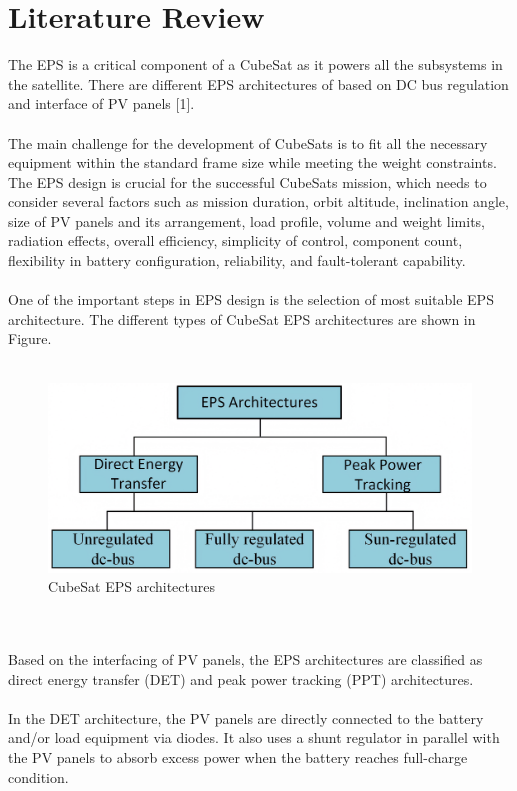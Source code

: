 \section{Literature Review}
\justifying
The EPS is a critical component of a CubeSat as it powers all the subsystems in the satellite. There are different EPS architectures of based on DC bus regulation and interface of PV panels [1].
\\ \\
The main challenge for the development of CubeSats is to fit all the necessary equipment within the standard frame size while meeting the weight constraints. The EPS design is crucial for the successful CubeSats mission, which needs to consider several factors such as mission duration, orbit altitude, inclination angle, size of PV panels and its arrangement, load profile, volume and weight limits, radiation effects, overall efficiency, simplicity of control, component count, flexibility in battery configuration, reliability, and fault-tolerant capability. 
\\ \\
One of the important steps in EPS design is the selection of most suitable EPS architecture. The different types of CubeSat EPS architectures are shown in Figure. 
\\ \\
\begin{figure}[h]
	\centering
	\includegraphics[width=\columnwidth]{IMGS/EPSarchitectures.jpg}
	\caption{CubeSat EPS architectures}
	\label{fig:arch}
\end{figure} 
\\ \\
Based on the interfacing of PV panels, the EPS architectures are classified as direct energy transfer (DET) and peak power tracking (PPT) architectures. 
\\ \\
In the DET architecture, the PV panels are directly connected to the battery and/or load equipment via diodes. It also uses a shunt regulator in parallel with the PV panels to absorb excess power when the battery reaches full-charge condition.
